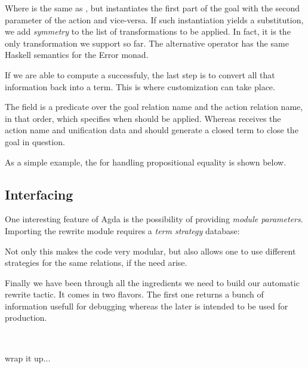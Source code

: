 
Where  is the same as , but instantiates the first part of the goal with the second parameter of the action and vice-versa. If such instantiation yields a substitution, we add \emph{symmetry} to the list of
transformations to be applied. In fact, it is the only transformation we support so far. The alternative operator has the same Haskell semantics for
the Error monad.

If we are able to compute a  successfuly, the last step is to convert
all that information back into a term. This is where customization can take place.


The  field is a predicate over the goal relation name and the action relation name, in that order, which specifies when  should be applied.
Whereas  receives the action name and unification data and should generate a closed term to close the goal in question.

As a simple example, the  for handling propositional equality is shown below.


\subsection{Interfacing}

One interesting feature of Agda is the possibility of providing \emph{module parameters}. Importing the rewrite module requires a \emph{term strategy} database:


Not only this makes the code very modular, but also allows one to use different strategies for the same relations, if the need arise.

Finally we have been through all the ingredients we need to build our automatic rewrite tactic. It comes in two flavors. The first one
returns a bunch of information usefull for debugging whereas the
later is intended to be used for production.

\\

\begin{TODO}
  \item wrap it up...
\end{TODO}


